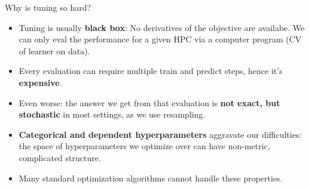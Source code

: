 \documentclass[11pt,compress,t,notes=noshow, xcolor=table]{beamer}
\begin{document}
\begin{vbframe}{Why is tuning so hard?}
  \begin{itemize}
\item Tuning is usually \textbf{black box}: No derivatives of the objective are availabe.
    We can only eval the performance for a given HPC via a computer program (CV of learner on data).
\item Every evaluation can require multiple train and predict steps, hence it's \textbf{expensive}.
\item Even worse: the answer we get from that evaluation is \textbf{not exact, but stochastic} in most settings, as we use resampling.
\item \textbf{Categorical and dependent hyperparameters} aggravate our difficulties: the space of hyperparameters we optimize over can have non-metric, complicated structure.
\item Many standard optimization algorithms cannot handle these properties.
\end{itemize}

\end{vbframe}

\endlecture
\end{document}
